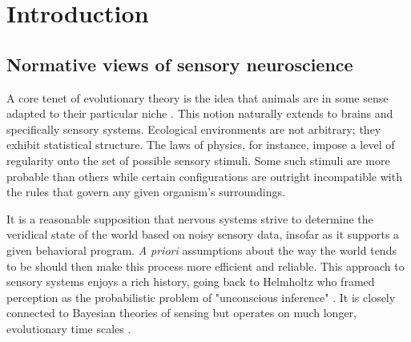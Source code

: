 \chapter{Introduction}
\label{chp:introduction}







\section{Normative views of sensory neuroscience}

A core tenet of evolutionary theory is the idea that animals are in some sense adapted to their particular niche \citep{Darwin:1859aa}. This notion naturally extends to brains and specifically sensory systems. Ecological environments are not arbitrary; they exhibit statistical structure. The laws of physics, for instance, impose a level of regularity onto the set of possible sensory stimuli. Some such stimuli are more probable than others while certain configurations are outright incompatible with the rules that govern any given organism's surroundings.

It is a reasonable supposition that nervous systems strive to determine the veridical state of the world based on noisy sensory data, insofar as it supports a given behavioral program. \textit{A priori} assumptions about the way the world tends to be should then make this process more efficient and reliable. This approach to sensory systems enjoys a rich history, going back to Helmholtz who framed perception as the probabilistic problem of "unconscious inference" \citep{Helmholtz:1867aa}. It is closely connected to Bayesian theories of sensing but operates on much longer, evolutionary time scales \citep{Doya:2007aa}.

